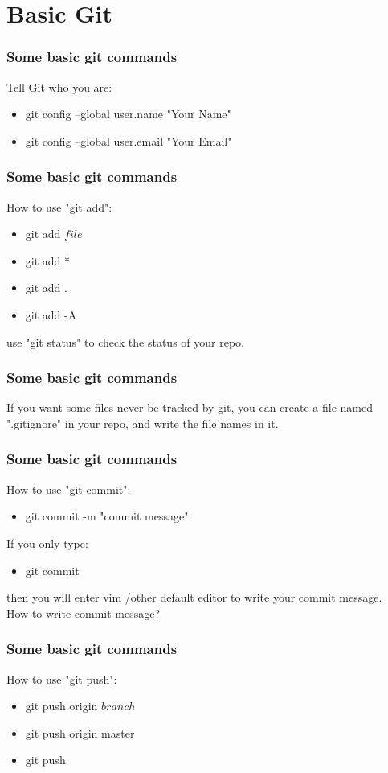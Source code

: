 \documentclass[aspectratio=169]{beamer}
\begin{document}
\section{Basic Git}
\begin{frame}
  \frametitle{Some basic git commands}
  Tell Git who you are:
  \begin{itemize}
    \item git config --global user.name "Your Name"
    \item git config --global user.email "Your Email"
  \end{itemize}
\end{frame}

\begin{frame}
  \frametitle{Some basic git commands}
  How to use "git add":
  \begin{itemize}
    \item git add $file$
    \item git add *
    \item git add .
    \item git add -A
  \end{itemize}
  use "git status" to check the status of your repo.

\end{frame}

\begin{frame}
  \frametitle{Some basic git commands}
  If you want some files never be tracked by git, you can create a file named ".gitignore" in your repo, and write the file names in it.
 
\end{frame}

\begin{frame}
  \frametitle{Some basic git commands}
  How to use "git commit":
  \begin{itemize}
    \item git commit -m "commit message"
  \end{itemize}
  If you only type: 
  \begin{itemize}
    \item git commit
  \end{itemize}
  then you will enter vim /other default editor to write your commit message.\\
  \href{https://www.conventionalcommits.org/en/v1.0.0/}{How to write commit message?}
\end{frame}

\begin{frame}
  \frametitle{Some basic git commands}
  How to use "git push":
  \begin{itemize}
    \item git push origin $branch$
    \item git push origin master
    \item git push
  \end{itemize}
\end{frame}
\end{document}
